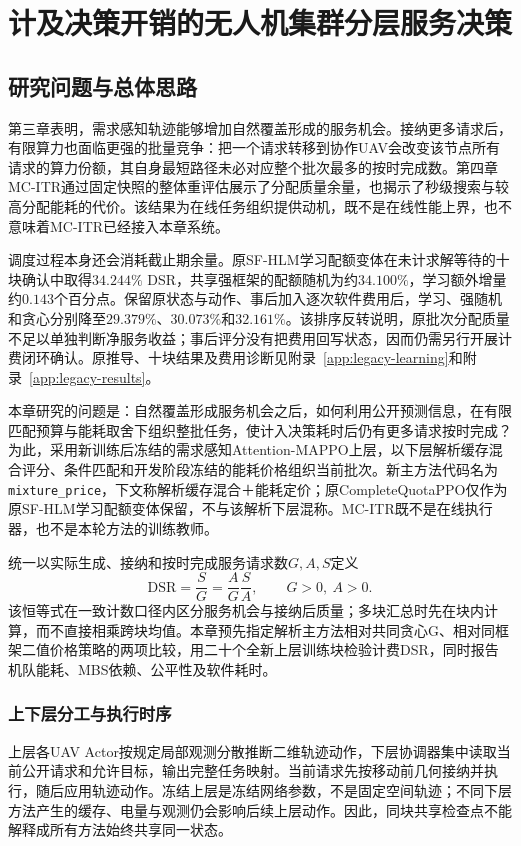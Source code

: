 \chapter{计及决策开销的无人机集群分层服务决策}
\label{cha:whole-system}
\label{cha:ch5-sfhlm}

\section{研究问题与总体思路}
\label{sec:whole-method}
\label{sec:ch5-motivation}
第三章表明，需求感知轨迹能够增加自然覆盖形成的服务机会。接纳更多请求后，有限算力也面临更强的批量竞争：把一个请求转移到协作UAV会改变该节点所有请求的算力份额，其自身最短路径未必对应整个批次最多的按时完成数。第四章MC-ITR通过固定快照的整体重评估展示了分配质量余量，也揭示了秒级搜索与较高分配能耗的代价。该结果为在线任务组织提供动机，既不是在线性能上界，也不意味着MC-ITR已经接入本章系统。

调度过程本身还会消耗截止期余量。原SF-HLM学习配额变体在未计求解等待的十块确认中取得$34.244\%$ DSR，共享强框架的配额随机为约$34.100\%$，学习额外增量约$0.143$个百分点。保留原状态与动作、事后加入逐次软件费用后，学习、强随机和贪心分别降至$29.379\%$、$30.073\%$和$32.161\%$。该排序反转说明，原批次分配质量不足以单独判断净服务收益；事后评分没有把费用回写状态，因而仍需另行开展计费闭环确认。原推导、十块结果及费用诊断见附录~\ref{app:legacy-learning}和附录~\ref{app:legacy-results}。

本章研究的问题是：自然覆盖形成服务机会之后，如何利用公开预测信息，在有限匹配预算与能耗取舍下组织整批任务，使计入决策耗时后仍有更多请求按时完成？为此，采用新训练后冻结的需求感知Attention-MAPPO上层，以下层解析缓存混合评分、条件匹配和开发阶段冻结的能耗价格组织当前批次。新主方法代码名为\texttt{mixture\_price}，下文称解析缓存混合＋能耗定价；原CompleteQuotaPPO仅作为原SF-HLM学习配额变体保留，不与该解析下层混称。MC-ITR既不是在线执行器，也不是本轮方法的训练教师。

统一以实际生成、接纳和按时完成服务请求数$G,A,S$定义
\begin{equation}
 \mathrm{DSR}=\frac{S}{G}=\frac{A}{G}\frac{S}{A},\qquad G>0,\ A>0.
 \label{eq:ch5-dsr-identity}
\end{equation}
该恒等式在一致计数口径内区分服务机会与接纳后质量；多块汇总时先在块内计算，而不直接相乘跨块均值。本章预先指定解析主方法相对共同贪心G、相对同框架二值价格策略的两项比较，用二十个全新上层训练块检验计费DSR，同时报告机队能耗、MBS依赖、公平性及软件耗时。

\subsection{上下层分工与执行时序}
\label{sec:ch5-swarm-coordination}
上层各UAV Actor按规定局部观测分散推断二维轨迹动作，下层协调器集中读取当前公开请求和允许目标，输出完整任务映射。当前请求先按移动前几何接纳并执行，随后应用轨迹动作。冻结上层是冻结网络参数，不是固定空间轨迹；不同下层方法产生的缓存、电量与观测仍会影响后续上层动作。因此，同块共享检查点不能解释成所有方法始终共享同一状态。

